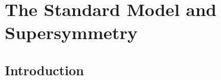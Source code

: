 

\setcounter{secnumdepth}{3}
\setcounter{tocdepth}{3}
\setlength{\parskip}{\smallskipamount}
\setlength{\parindent}{0pt}


\makeatletter


\providecommand{\tabularnewline}{\\}


\makeatother

%

\chapter{The Standard Model and Supersymmetry}



\section{Introduction}

